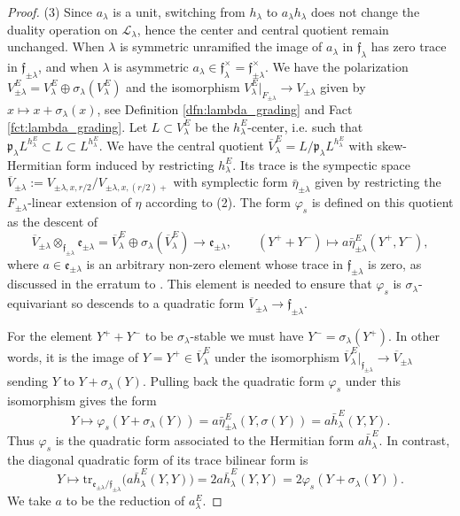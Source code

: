 \documentclass{article}
\def\mf#1{\mathfrak{#1}}
\def\mc#1{\mathcal{#1}}
\def\tx#1{\textrm{#1}}
\def\ol#1{\overline{#1}}
\theoremstyle{definition}
\numberwithin{equation}{subsection}
\renewcommand{\-}{\hyp{}}
\newcommand{\rf}{\mathfrak{f}}
\begin{document}
\begin{proof}
	(3) Since $a_\lambda$ is a unit, switching from $h_\lambda$ to $a_\lambda h_\lambda$ does not change the duality operation on $\mc{L}_\lambda$, hence the center and central quotient remain unchanged. When $\lambda$ is symmetric unramified the image of $a_\lambda$ in $\rf_\lambda$ has zero trace in $\rf_{\pm\lambda}$, and when $\lambda$ is asymmetric $a_\lambda \in \rf_\lambda^\times=\rf_{\pm\lambda}^\times$. 
	We have the polarization $V_{\pm\lambda}^E = V_\lambda^E \oplus \sigma_\lambda(V_\lambda^E)$ and the isomorphism $V_\lambda^E|_{F_{\pm\lambda}} \to V_{\pm\lambda}$ given by $x \mapsto x + \sigma_\lambda(x)$, see Definition \ref{dfn:lambda_grading} and Fact \ref{fct:lambda_grading}. Let $L \subset V_\lambda^E$ be the $h_\lambda^E$-center, i.e. such that $\mf{p}_\lambda L^{h_\lambda^E} \subset L \subset L^{h_\lambda^E}$. We have the central quotient $\ol{V}_\lambda^E=L/\mf{p}_\lambda L^{h_\lambda^E}$ with skew-Hermitian form induced by restricting $h_\lambda^E$. Its trace is the sympectic space $\ol{V}_{\pm\lambda} := V_{\pm\lambda,x,r/2}/V_{\pm\lambda,x,(r/2)+}$ with symplectic form $\bar\eta_{\pm\lambda}$ given by restricting the $F_{\pm\lambda}$-linear extension of $\eta$ according to (2).  The form $\varphi_s$ is defined on this quotient as the descent of 
\[ \ol{V}_{\pm\lambda}\otimes_{\rf_{\pm\lambda}} \mathfrak{e}_{\pm\lambda} = \ol{V}_\lambda^E \oplus \sigma_\lambda(\ol{V}_\lambda^E) \to \mathfrak{e}_{\pm\lambda},\qquad (Y^++Y^-) \mapsto a\bar\eta_{\pm\lambda}^E(Y^+,Y^-), \]
where $a \in \mathfrak{e}_{\pm\lambda}$ is an arbitrary non-zero element whose trace in $\mathfrak{f}_{\pm\lambda}$ is zero, as discussed in the erratum to \cite{FKS23}. This element is needed to ensure that $\varphi_s$ is $\sigma_\lambda$-equivariant so descends to a quadratic form $\ol{V}_{\pm\lambda} \to \rf_{\pm\lambda}$.

For the element $Y^++Y^-$ to be $\sigma_\lambda$-stable we must have $Y^-=\sigma_\lambda(Y^+)$. In other words, it is the image of $Y=Y^+ \in \ol{V}_\lambda^E$ under the isomorphism $\ol{V}_\lambda^E|_{\rf_{\pm\lambda}} \to \ol{V}_{\pm\lambda}$ sending $Y$ to $Y+\sigma_\lambda(Y)$. Pulling back the quadratic form $\varphi_s$ under this isomorphism gives the form
\[ Y \mapsto \varphi_s(Y+\sigma_\lambda(Y)) = a\bar\eta_{\pm\lambda}^E(Y,\sigma(Y))=a\bar h_\lambda^E(Y,Y). \]
Thus $\varphi_s$ is the quadratic form associated to the Hermitian form $a\bar h_\lambda^E$. In contrast, the diagonal quadratic form of its trace bilinear form is
\[ Y \mapsto \tx{tr}_{\mf{e}_{\pm\lambda}/\rf_{\pm\lambda}}\big(a\bar h_\lambda^E(Y,Y)\big)=2a\bar h_\lambda^E(Y,Y)=2\varphi_s(Y+\sigma_\lambda(Y)). \]
We take $a$ to be the reduction of $a_\lambda^E$.
\end{proof}
\end{document}
